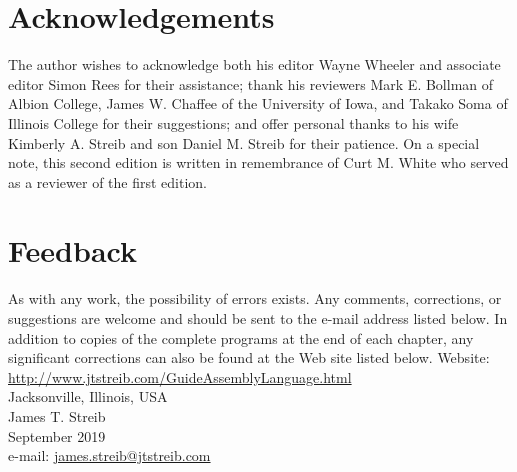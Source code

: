\documentclass[10pt]{book}
\begin{document}
\section{Acknowledgements}
The author wishes to acknowledge both his editor Wayne Wheeler and associate editor Simon Rees for their assistance; thank his reviewers Mark E. Bollman of Albion College, James W. Chaffee of the University of Iowa, and Takako Soma of Illinois College for their suggestions; and offer personal thanks to his wife Kimberly A. Streib and son Daniel M. Streib for their patience. On a special note, this second edition is written in remembrance of Curt M. White who served as a reviewer of the first edition.

\section{Feedback}
As with any work, the possibility of errors exists. Any comments, corrections, or suggestions are welcome and should be sent to the e-mail address listed below. In addition to copies of the complete programs at the end of each chapter, any significant corrections can also be found at the Web site listed below.
Website: \href{http://www.jtstreib.com/GuideAssemblyLanguage.html}{http://www.jtstreib.com/GuideAssemblyLanguage.html}\\
Jacksonville, Illinois, USA\\
James T. Streib\\
September 2019\\
e-mail: \href{mailto:james.streib@jtstreib.com}{james.streib@jtstreib.com}
\end{document}
